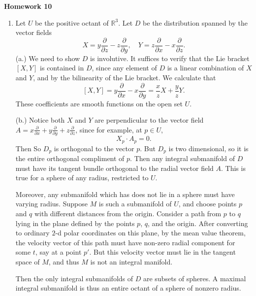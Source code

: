 \documentclass[11pt, reqno]{article}
\theoremstyle{plain}
\theoremstyle{definition}
\theoremstyle{remark}
\newcommand{\RR}{\mathbb{R}}
\begin{document}
\topmargin=-40pt
\renewcommand{\headrulewidth}{1pt}
\renewcommand{\headsep}{20pt}
\thispagestyle{fancy}

{\Huge \bfseries \noindent Homework 10}

\begin{enumerate}
    \item[1.] Let $U$ be the positive octant of $\RR^3$. Let $D$ be the distribution spanned 
    by the vector fields 
    \[
        X = y\frac{\partial}{\partial z} - z \frac{\partial}{\partial y}, \quad
        Y = z \frac{\partial}{\partial x} - x \frac{\partial}{\partial z}.
    \]
    (a.) We need to show $D$ is involutive. It suffices to verify that the Lie bracket
    $[X, Y]$ is contained in $D$, since any element of $D$ is a linear combination of $X$ and $Y$, 
    and by the bilinearity of the Lie bracket. We calculate that
    \[
        [X, Y] = y \frac{\partial}{\partial x} - x \frac{\partial}{\partial y} = \frac{x}{z}X + \frac{y}{z}Y.
    \]
    These coefficients are smooth functions on the open set $U$.

    (b.)  Notice both $X$ and $Y$ are perpendicular to the vector field $A = x \frac{\partial}{\partial x}
    + y \frac{\partial}{\partial y} + z \frac{\partial}{\partial z}$, since for example, at $p \in U$,
    \[
        X_p \cdot A_p = 0.
    \]  
    Then So $D_p$ is orthogonal to the vector $p$. But $D_p$ is two dimensional, so it is the entire orthogonal
    compliment of $p$. Then any integral submanifold of $D$ must have its tangent bundle orthogonal to the 
    radial vector field $A$. This is true for a sphere of any radius, restricted to $U$. 
    
    Moreover, any submanifold which has does not lie in a sphere must have varying radius. Suppose
    $M$ is such a submanifold of $U$, and choose points $p$ and $q$ with different distances from the origin.
    Consider a path from $p$ to $q$ lying in the plane defined by the points $p$, $q$, and the origin. 
    After converting to ordinary $2$-d polar coordinates on this plane, by the mean value theorem, 
    the velocity vector of this path must have non-zero radial component for some $t$, say at a point $p'$. 
    But this velocity vector must lie in the tangent space of $M$, and thus $M$ is not an integral manifold.
    
    Then the only integral submanifolds of $D$ are subsets of spheres. A maximal integral submanifold
    is thus an entire octant of a sphere of nonzero radius. 


\end{enumerate}
\end{document}
